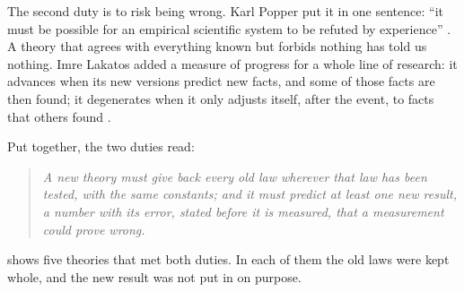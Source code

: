 The second duty is to risk being wrong. Karl Popper put it in one sentence: \enquote{it must be possible for an empirical scientific system to be refuted by experience} \citep[section~6]{Popper1959}. A theory that agrees with everything known but forbids nothing has told us nothing. Imre Lakatos added a measure of progress for a whole line of research: it advances when its new versions predict new facts, and some of those facts are then found; it degenerates when it only adjusts itself, after the event, to facts that others found \citep{Lakatos1970}.

\par{}\baselineskip{}\baselineskip{}\baselineskip{}\baselineskip\vskip 0pt
Put together, the two duties read:
\begin{quote}
\itshape A new theory must give back every old law wherever that law has been tested, with the same constants; and it must predict at least one new result, a number with its error, stated before it is measured, that a measurement could prove wrong.
\end{quote}

 shows five theories that met both duties. In each of them the old laws were kept whole, and the new result was not put in on purpose.

